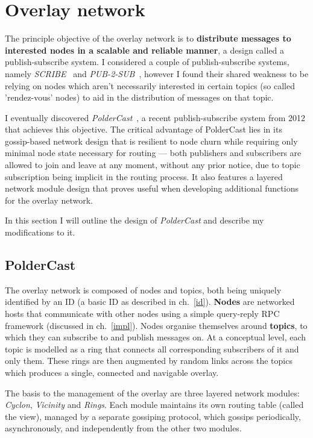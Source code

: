 \documentclass[10pt,a4paper,onecolumn]{article}
\begin{document}
\section{Overlay network}
\label{network}
The principle objective of the overlay network is to \textbf{distribute messages to interested nodes in a scalable and reliable manner}, a design called a publish-subscribe system. I considered a couple of publish-subscribe systems, namely \textit{SCRIBE}~\cite{scribe} and \textit{PUB-2-SUB}~\cite{pub2sub}, however I found their shared weakness to be relying on nodes which aren't necessarily interested in certain topics (so called 'rendez-vous' nodes) to aid in the distribution of messages on that topic.

I eventually discovered \textit{PolderCast}~\cite{poldercast}, a recent publish-subscribe system from 2012 that achieves this objective. The critical advantage of PolderCast lies in its gossip-based network design that is resilient to node churn while requiring only minimal node state necessary for routing — both publishers and subscribers are allowed to join and leave at any moment, without any prior notice, due to topic subscription being implicit in the routing process. It also features a layered network module design that proves useful when developing additional functions for the overlay network.

In this section I will outline the design of \textit{PolderCast} and describe my modifications to it.

\subsection{PolderCast}
The overlay network is composed of nodes and topics, both being uniquely identified by an ID (a basic ID as described in ch.~\ref{id}). \textbf{Nodes} are networked hosts that communicate with other nodes using a simple query-reply RPC framework (discussed in ch.~\ref{impl}). Nodes organise themselves around \textbf{topics}, to which they can subscribe to and publish messages on. At a conceptual level, each topic is modelled as a ring that connects all corresponding subscribers of it and only them. These rings are then augmented by random links across the topics which produces a single, connected and navigable overlay. 

The basis to the management of the overlay are three layered network modules: \emph{Cyclon}, \emph{Vicinity} and \emph{Rings}. Each module maintains its own routing table (called the view), managed by a separate gossiping protocol, which gossips periodically, asynchronously, and independently from the other two modules.
\end{document}
